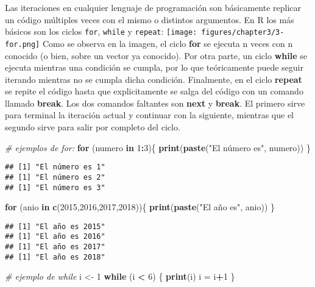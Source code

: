 \documentclass[]{book}
\newenvironment{Shaded}{\begin{snugshade}}{\end{snugshade}}
\newcommand{\CommentTok}[1]{\textcolor[rgb]{0.56,0.35,0.01}{\textit{#1}}}
\newcommand{\ControlFlowTok}[1]{\textcolor[rgb]{0.13,0.29,0.53}{\textbf{#1}}}
\newcommand{\DecValTok}[1]{\textcolor[rgb]{0.00,0.00,0.81}{#1}}
\newcommand{\KeywordTok}[1]{\textcolor[rgb]{0.13,0.29,0.53}{\textbf{#1}}}
\newcommand{\NormalTok}[1]{#1}
\newcommand{\OperatorTok}[1]{\textcolor[rgb]{0.81,0.36,0.00}{\textbf{#1}}}
\newcommand{\StringTok}[1]{\textcolor[rgb]{0.31,0.60,0.02}{#1}}
\begin{document}
Las iteraciones en cualquier lenguaje de programación son básicamente replicar un código múltiples veces con el mismo o distintos argumentos. En R los más básicos son los ciclos \texttt{for}, \texttt{while} y \texttt{repeat}:
\texttt{[image: figures/chapter3/3-for.png]}
Como se observa en la imagen, el ciclo \textbf{for} se ejecuta n veces con n conocido (o bien, sobre un vector ya conocido). Por otra parte, un ciclo \textbf{while} se ejecuta mientras una condición se cumpla, por lo que teóricamente puede seguir iterando mientras no se cumpla dicha condición. Finalmente, en el ciclo \textbf{repeat} se repite el código hasta que explicitamente se salga del código con un comando llamado \textbf{break}. Los dos comandos faltantes son \textbf{next} y \textbf{break}. El primero sirve para terminal la iteración actual y continuar con la siguiente, mientras que el segundo sirve para salir por completo del ciclo.

\begin{Shaded}
\begin{Highlighting}[]
\CommentTok{# ejemplos de for:}
\ControlFlowTok{for}\NormalTok{ (numero }\ControlFlowTok{in} \DecValTok{1}\OperatorTok{:}\DecValTok{3}\NormalTok{)\{}
  \KeywordTok{print}\NormalTok{(}\KeywordTok{paste}\NormalTok{(}\StringTok{"El número es"}\NormalTok{, numero))}
\NormalTok{\}}
\end{Highlighting}
\end{Shaded}

\begin{verbatim}
## [1] "El número es 1"
## [1] "El número es 2"
## [1] "El número es 3"
\end{verbatim}

\begin{Shaded}
\begin{Highlighting}[]
\ControlFlowTok{for}\NormalTok{ (anio }\ControlFlowTok{in} \KeywordTok{c}\NormalTok{(}\DecValTok{2015}\NormalTok{,}\DecValTok{2016}\NormalTok{,}\DecValTok{2017}\NormalTok{,}\DecValTok{2018}\NormalTok{))\{}
  \KeywordTok{print}\NormalTok{(}\KeywordTok{paste}\NormalTok{(}\StringTok{"El año es"}\NormalTok{, anio))}
\NormalTok{\}}
\end{Highlighting}
\end{Shaded}

\begin{verbatim}
## [1] "El año es 2015"
## [1] "El año es 2016"
## [1] "El año es 2017"
## [1] "El año es 2018"
\end{verbatim}

\begin{Shaded}
\begin{Highlighting}[]
\CommentTok{# ejemplo de while}
\NormalTok{i <-}\StringTok{ }\DecValTok{1}
\ControlFlowTok{while}\NormalTok{ (i }\OperatorTok{<}\StringTok{ }\DecValTok{6}\NormalTok{) \{}
  \KeywordTok{print}\NormalTok{(i)}
\NormalTok{  i =}\StringTok{ }\NormalTok{i}\OperatorTok{+}\DecValTok{1}
\NormalTok{\}}
\end{Highlighting}
\end{Shaded}
\end{document}
